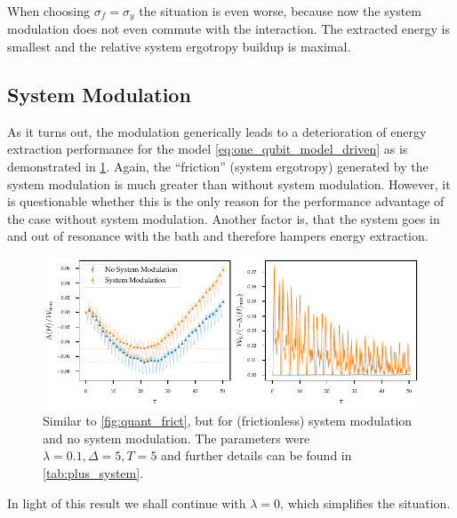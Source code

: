 When choosing \(σ_{f}=σ_{y}\) the situation is even worse, because now
the system modulation does not even commute with the interaction. The
extracted energy is smallest and the relative system ergotropy buildup
is maximal.

\subsection{System Modulation}
\label{sec:sys_mod_v_no_sys_mod}
As it turns out, the modulation generically leads to a deterioration
of energy extraction performance for the model
\cref{eq:one_qubit_model_driven} as is demonstrated in
\cref{fig:quant_frict_sys_no_sys}. Again, the ``friction'' (system
ergotropy) generated by the system modulation is much greater than
without system modulation. However, it is questionable whether this is
the only reason for the performance advantage of the case without
system modulation. Another factor is, that the system goes in and out
of resonance with the bath and therefore hampers energy
extraction.
\begin{figure}[h]
  \centering
  \includegraphics{figs/one_bath_mod/system_vs_no_system}
  \caption{\label{fig:quant_frict_sys_no_sys} Similar to
    \cref{fig:quant_frict}, but for (frictionless) system modulation
    and no system modulation. The parameters were \(λ=0.1, Δ=5, T=5\)
    and further details can be found in \cref{tab:plus_system}.}
\end{figure}

In light of this result we shall continue with \(λ=0\), which
simplifies the situation.

